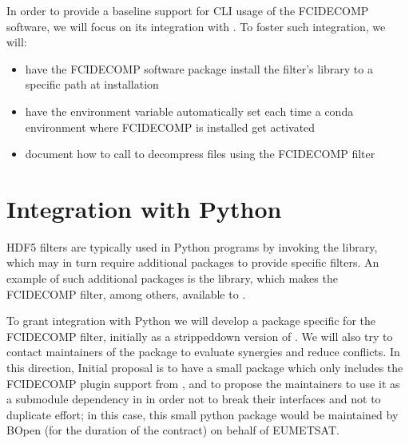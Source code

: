 \documentclass[a4paper,10pt,english]{sphinxmanual}
\begin{document}
\sphinxAtStartPar
In order to provide a baseline support for CLI usage of the FCIDECOMP software, we will focus on its integration with
. To foster such integration, we will:
\begin{itemize}
\item {} 
\sphinxAtStartPar
have the FCIDECOMP software package install the filter’s library to a specific path at installation

\item {} 
\sphinxAtStartPar
have the  environment variable automatically set each time a conda environment where FCIDECOMP is installed get activated

\item {} 
\sphinxAtStartPar
document how to call  to decompress files using the FCIDECOMP filter

\end{itemize}


\section{Integration with Python}
\label{\detokenize{support_and_integration:integration-with-python}}
\sphinxAtStartPar
HDF5 filters are typically used in Python programs by invoking the  library, which may in turn require
additional packages to provide specific filters. An example of such additional packages is the  library,
which makes the FCIDECOMP filter, among others, available to .

\sphinxAtStartPar
To grant integration with Python we will develop a package specific for the FCIDECOMP filter, initially as a
stripped\sphinxhyphen{}down version of {\hyperref[\detokenize{introduction:hdf5plugin}]{}}. We will also try to contact maintainers of the 
package to evaluate synergies and reduce conflicts. In this direction, Initial proposal is to have a small package which
only includes the FCIDECOMP plugin support from , and to propose the  maintainers to use it
as a sub\sphinxhyphen{}module dependency in  in order not to break their interfaces and not to duplicate effort; in
this case, this small python package would be maintained by B\sphinxhyphen{}Open (for the duration of the contract) on behalf of
EUMETSAT.
\end{document}
